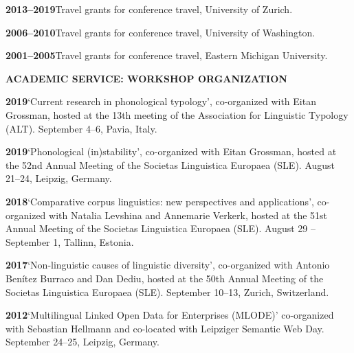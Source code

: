 \documentclass[11pt]{article}
\newcommand{\hangpara}{
 \setlength{\parindent}{0in} %
 \hangindent=0.42in %
}
\begin{document}
\vskip 6pt
\hangpara
{\bf 2013--2019}\hspace{1ex}Travel grants for conference travel, University of Zurich.

\vskip 6pt
\hangpara
{\bf 2006--2010}\hspace{1ex}Travel grants for conference travel, University of Washington.

\vskip 6pt
\hangpara
{\bf 2001--2005}\hspace{1ex}Travel grants for conference travel, Eastern Michigan University.


\vskip 20pt
\begin{flushleft}
{\bf ACADEMIC SERVICE: WORKSHOP ORGANIZATION}
\end{flushleft}


\hangpara
{\bf 2019}\hspace{1ex}`Current research in phonological typology', co-organized with Eitan Grossman, hosted at the 13th meeting of the Association for Linguistic Typology (ALT). September 4--6, Pavia, Italy.

\hangpara
\vskip 6pt
{\bf 2019}\hspace{1ex}`Phonological (in)stability', co-organized with Eitan Grossman, hosted at the 52nd Annual Meeting of the Societas Linguistica Europaea (SLE). August 21--24, Leipzig, Germany.

\hangpara
\vskip 6pt
{\bf 2018}\hspace{1ex}`Comparative corpus linguistics: new perspectives and applications', co-organized with Natalia Levshina and Annemarie Verkerk, hosted at the 51st Annual Meeting of the Societas Linguistica Europaea (SLE). August 29 -- September 1, Tallinn, Estonia.

\hangpara
\vskip 6pt
{\bf 2017}\hspace{1ex}`Non-linguistic causes of linguistic diversity', co-organized with Antonio Benítez Burraco and Dan Dediu, hosted at the 50th Annual Meeting of the Societas Linguistica Europaea (SLE). September 10--13, Zurich, Switzerland.

\vskip 6pt
\hangpara
{\bf 2012}\hspace{1ex}`Multilingual Linked Open Data for Enterprises (MLODE)' co-organized with Sebastian Hellmann and co-located with Leipziger Semantic Web Day. September 24--25, Leipzig, Germany.
\end{document}
